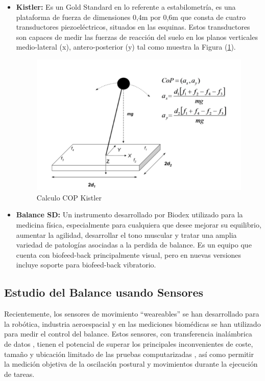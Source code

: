 \documentclass[12pt,a4paper]{article}
\begin{document}
\begin{itemize}
	\item \textbf{Kistler:} Es un Gold Standard  en lo referente a estabilometría\cite{donath_testing_2012}, es una plataforma de fuerza de dimensiones
	0,4m por 0,6m que consta de cuatro 	transductores piezoeléctricos, situados en las esquinas. Estos transductores son capaces de medir las fuerzas de reacción del suelo en los planos verticales medio-lateral (x), antero-posterior (y) tal como muestra la Figura (\ref{fig:Kistler}).

\begin{figure}[H]
	\centering
	\includegraphics[width=0.65\linewidth]{images/Kistler}
	\caption{Calculo COP Kistler}
	\label{fig:Kistler}
\end{figure}

\item \textbf{Balance SD:} Un instrumento desarrollado por Biodex \cite{Biodex} utilizado para la medicina física, especialmente para cualquiera que desee mejorar su equilibrio, aumentar la agilidad, desarrollar el tono muscular y tratar una amplia variedad de patologías asociadas a la perdida de balance.
Es un equipo que cuenta con biofeed-back principalmente visual, pero en nuevas versiones incluye soporte para biofeed-back vibratorio.
\end{itemize}

\subsection{Estudio del Balance usando Sensores}
Recientemente, los sensores de movimiento ``weareables'' se han desarrollado para la robótica, industria aeroespacial y en las mediciones biomédicas se han utilizado para medir el control del balance\cite{mancini_relevance_2010}. Estos sensores, con transferencia inalámbrica de datos , tienen el potencial de superar los principales inconvenientes de coste, tamaño y ubicación limitado de las pruebas computarizadas , así como permitir la medición objetiva de la oscilación postural y movimientos durante la ejecución de tareas.
\end{document}
